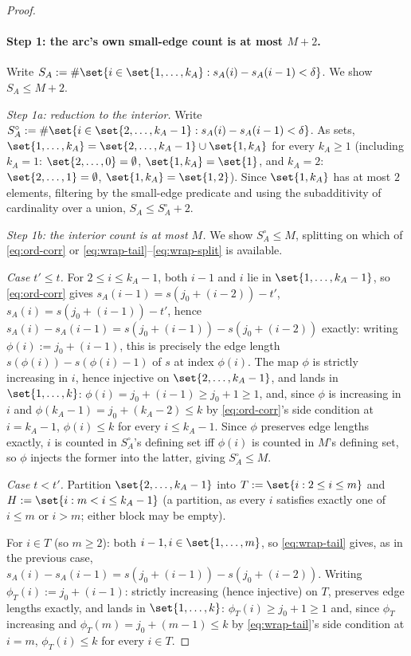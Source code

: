 \begin{proof}
  \paragraph{Step 1: the arc's own small-edge count is at most $M+2$.} Write $S_A := \#\set{i \in
  \set{1,\dots,k_A} : s_A(i)-s_A(i-1)<\delta}$. We show $S_A \le M+2$.

  \emph{Step 1a: reduction to the interior.} Write $S_A^{\circ} := \#\set{i\in\set{2,\dots,k_A-1} :
  s_A(i)-s_A(i-1)<\delta}$. As sets, $\set{1,\dots,k_A} = \set{2,\dots,k_A-1}\cup\set{1,k_A}$ for
  every $k_A\ge1$ (including $k_A=1$: $\set{2,\dots,0}=\emptyset$, $\set{1,k_A}=\set{1}$, and
  $k_A=2$: $\set{2,\dots,1}=\emptyset$, $\set{1,k_A}=\set{1,2}$). Since $\set{1,k_A}$ has at most
  $2$ elements, filtering by the small-edge predicate and using the subadditivity of cardinality
  over a union, $S_A \le S_A^{\circ} + 2$.

  \emph{Step 1b: the interior count is at most $M$.} We show $S_A^{\circ}\le M$, splitting on which
  of \eqref{eq:ord-corr} or \eqref{eq:wrap-tail}--\eqref{eq:wrap-split} is available.

  \emph{Case $t'\le t$.} For $2\le i\le k_A-1$, both $i-1$ and $i$ lie in $\set{1,\dots,k_A-1}$, so
  \eqref{eq:ord-corr} gives $s_A(i-1)=s(j_0+(i-2))-t'$, $s_A(i)=s(j_0+(i-1))-t'$, hence
  $s_A(i)-s_A(i-1) = s(j_0+(i-1))-s(j_0+(i-2))$ exactly: writing $\phi(i):=j_0+(i-1)$, this is
  precisely the edge length $s(\phi(i))-s(\phi(i)-1)$ of $s$ at index $\phi(i)$. The map $\phi$ is
  strictly increasing in $i$, hence injective on $\set{2,\dots,k_A-1}$, and lands in
  $\set{1,\dots,k}$: $\phi(i) = j_0+(i-1) \ge j_0+1 \ge 1$, and, since $\phi$ is increasing in $i$
  and $\phi(k_A-1)=j_0+(k_A-2)\le k$ by \eqref{eq:ord-corr}'s side condition at $i=k_A-1$,
  $\phi(i)\le k$ for every $i\le k_A-1$. Since $\phi$ preserves edge lengths exactly, $i$ is
  counted in $S_A^{\circ}$'s defining set iff $\phi(i)$ is counted in $M$'s defining set, so $\phi$
  injects the former into the latter, giving $S_A^{\circ}\le M$.

  \emph{Case $t<t'$.} Partition $\set{2,\dots,k_A-1}$ into $T:=\set{i : 2\le i\le m}$ and
  $H:=\set{i : m<i\le k_A-1}$ (a partition, as every $i$ satisfies exactly one of $i\le m$ or
  $i>m$; either block may be empty).

  For $i\in T$ (so $m\ge2$): both $i-1,i \in \set{1,\dots,m}$, so \eqref{eq:wrap-tail} gives, as in
  the previous case, $s_A(i)-s_A(i-1) = s(j_0+(i-1))-s(j_0+(i-2))$. Writing
  $\phi_T(i):=j_0+(i-1)$: strictly increasing (hence injective) on $T$, preserves edge lengths
  exactly, and lands in $\set{1,\dots,k}$: $\phi_T(i)\ge j_0+1\ge1$ and, since $\phi_T$ increasing
  and $\phi_T(m)=j_0+(m-1)\le k$ by \eqref{eq:wrap-tail}'s side condition at $i=m$, $\phi_T(i)\le k$
  for every $i\in T$.


\end{proof}
